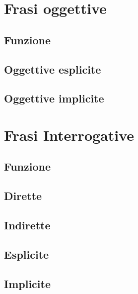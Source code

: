 \documentclass[a4paper,twoside,11pt,chapterprefix=false,bibliography=totocnumbered,listof=flat]{scrbook}
\begin{document}
\hypertarget{frasi-oggettive}{%
\chapter{Frasi oggettive}\label{frasi-oggettive}}

\hypertarget{funzione-1}{%
\section{Funzione}\label{funzione-1}}

\hypertarget{oggettive-esplicite}{%
\section{Oggettive esplicite}\label{oggettive-esplicite}}

\hypertarget{oggettive-implicite}{%
\section{Oggettive implicite}\label{oggettive-implicite}}

\hypertarget{frasi-interrogative}{%
\chapter{Frasi Interrogative}\label{frasi-interrogative}}

\hypertarget{funzione-2}{%
\section{Funzione}\label{funzione-2}}

\hypertarget{dirette}{%
\section{Dirette}\label{dirette}}

\hypertarget{indirette}{%
\section{Indirette}\label{indirette}}

\hypertarget{esplicite}{%
\section{Esplicite}\label{esplicite}}

\hypertarget{implicite}{%
\section{Implicite}\label{implicite}}
\end{document}
